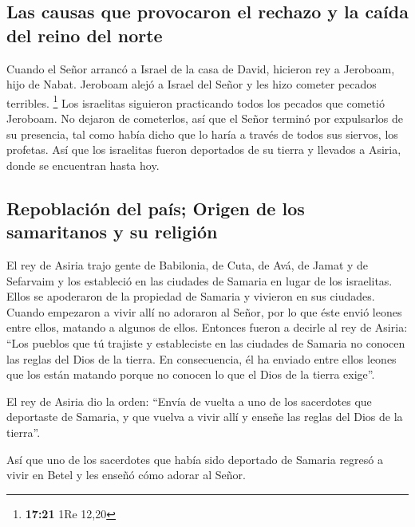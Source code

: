 \hypertarget{las-causas-que-provocaron-el-rechazo-y-la-cauxedda-del-reino-del-norte}{%
\subsection{Las causas que provocaron el rechazo y la caída del reino
del
norte}\label{las-causas-que-provocaron-el-rechazo-y-la-cauxedda-del-reino-del-norte}}

 Cuando el Señor arrancó a Israel de la casa de David,
hicieron rey a Jeroboam, hijo de Nabat. Jeroboam alejó a Israel del
Señor y les hizo cometer pecados terribles. \footnote{\textbf{17:21} 1Re
  12,20}  Los israelitas siguieron practicando todos los
pecados que cometió Jeroboam. No dejaron de cometerlos, 
así que el Señor terminó por expulsarlos de su presencia, tal como había
dicho que lo haría a través de todos sus siervos, los profetas. Así que
los israelitas fueron deportados de su tierra y llevados a Asiria, donde
se encuentran hasta hoy.

\hypertarget{repoblaciuxf3n-del-pauxeds-origen-de-los-samaritanos-y-su-religiuxf3n}{%
\subsection{Repoblación del país; Origen de los samaritanos y su
religión}\label{repoblaciuxf3n-del-pauxeds-origen-de-los-samaritanos-y-su-religiuxf3n}}

 El rey de Asiria trajo gente de Babilonia, de Cuta, de
Avá, de Jamat y de Sefarvaim y los estableció en las ciudades de Samaria
en lugar de los israelitas. Ellos se apoderaron de la propiedad de
Samaria y vivieron en sus ciudades.  Cuando empezaron a
vivir allí no adoraron al Señor, por lo que éste envió leones entre
ellos, matando a algunos de ellos.  Entonces fueron a
decirle al rey de Asiria: ``Los pueblos que tú trajiste y estableciste
en las ciudades de Samaria no conocen las reglas del Dios de la tierra.
En consecuencia, él ha enviado entre ellos leones que los están matando
porque no conocen lo que el Dios de la tierra exige''.

 El rey de Asiria dio la orden: ``Envía de vuelta a uno
de los sacerdotes que deportaste de Samaria, y que vuelva a vivir allí y
enseñe las reglas del Dios de la tierra''.

 Así que uno de los sacerdotes que había sido deportado
de Samaria regresó a vivir en Betel y les enseñó cómo adorar al Señor.


